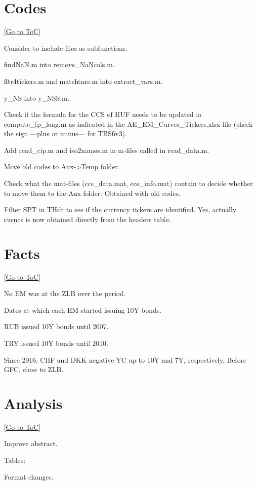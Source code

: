 \documentclass[12pt]{article}
\newcommand{\gototoc}{\vspace{-1.8cm} \null\hfill [\hyperlink{toc}{Go to ToC}] \newline}
\newcommand{\cmark}{\ding{51}}
\newcommand{\xmark}{\ding{55}}
\newcommand{\done}{\rlap{$\square$}{\raisebox{2pt}{\large\hspace{1pt}\cmark}}%
	\hspace{-2.5pt}}
\newcommand{\wontdo}{\rlap{$\square$}{\large\hspace{1pt}\xmark}}
\begin{document}
\section{Codes}
\gototoc
\begin{todolist}
	\item Consider to include files as subfunctions.
	\begin{todolist}
		\item findNaN.m into remove_NaNcols.m.
		\item fltr4tickers.m and matchtnrs.m into extract_vars.m.
		\item y_NS into y_NSS.m.
	\end{todolist}
	\item Check if the formula for the CCS of HUF needs to be updated in compute_fp_long.m as indicated in the AE_EM_Curves_Tickers.xlsx file (check the sign ---plus or minus--- for TBS6v3).
	\item[\done] Add read_cip.m and iso2names.m in m-files called in read_data.m.
	\item[\done] Move old codes to Aux->Temp folder.
	\item[\wontdo] Check what the mat-files (ccs_data.mat, ccs_info.mat) contain to decide whether to move them to the Aux folder. Obtained with old codes.
	\item[\done] Filter SPT in THdt to see if the currency tickers are identified. Yes, actually curncs is now obtained directly from the headers table.
\end{todolist}

\section{Facts}
\gototoc
\begin{todolist}
	\item No EM was at the ZLB over the period.
	\item Dates at which each EM started issuing 10Y bonds.
	\begin{todolist}
		\item RUB issued 10Y bonds until 2007.
		\item TRY  issued 10Y bonds until 2010.
	\end{todolist}
	\item Since 2016, CHF and DKK negative YC up to 10Y and 7Y, respectively. Before GFC, close to ZLB.
\end{todolist}

\section{Analysis}
\gototoc
\begin{todolist}
	\item[\done] Improve abstract.
	\item Tables:
	\begin{todolist}
		\item Format changes.
	\end{todolist}
\end{todolist}
\end{document}

